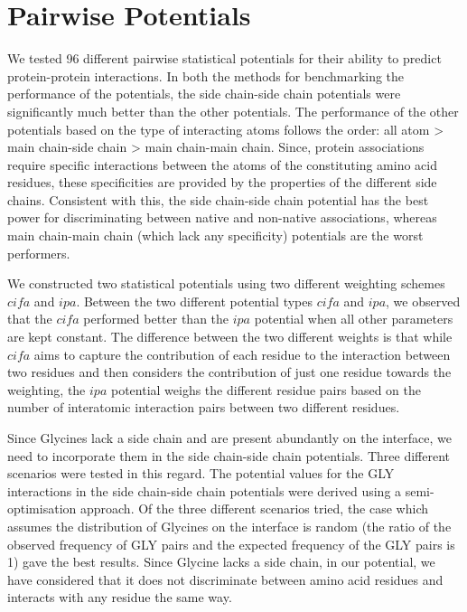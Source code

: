 \section{Pairwise Potentials}
We tested 96 different pairwise statistical potentials for their ability to predict protein-protein interactions. In both the methods for benchmarking the performance of the potentials, the side chain-side chain potentials were significantly much better than the other potentials. The performance of the other potentials based on the type of interacting atoms follows the order: all atom > main chain-side chain > main chain-main chain. Since, protein associations require specific interactions between the atoms of the constituting amino acid residues, these specificities are provided by the properties of the different side chains. Consistent with this, the side chain-side chain potential has the best power for discriminating between native and non-native associations, whereas main chain-main chain (which lack any specificity) potentials are the worst performers.
\par
We constructed two statistical potentials using two different weighting schemes $cifa$ and $ipa$. Between the two different potential types $cifa$ and $ipa$, we observed that the $cifa$ performed better than the $ipa$ potential when all other parameters are kept constant. The difference between the two different weights is that while $cifa$ aims to capture the contribution of each residue to the interaction between two residues and then considers the contribution of just one residue towards the weighting, the $ipa$ potential weighs the different residue pairs based on the number of interatomic interaction pairs between two different residues.
\par
Since Glycines lack a side chain and are present abundantly on the interface, we need to incorporate them in the side chain-side chain potentials. Three different scenarios were tested in this regard. The potential values for the GLY interactions in the side chain-side chain potentials were derived using a semi-optimisation approach. Of the three different scenarios tried, the case which assumes the distribution of Glycines on the interface is random (the ratio of the observed frequency of GLY pairs and the expected frequency of the GLY pairs is 1) gave the best results. Since Glycine lacks a side chain, in our potential, we have considered that it does not discriminate between amino acid residues and interacts with any residue the same way.
